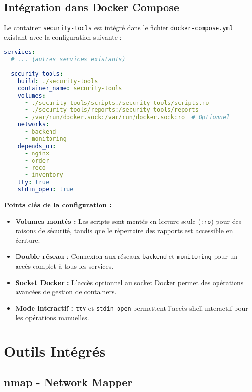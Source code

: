 \subsection{Intégration dans Docker Compose}
Le container \texttt{security-tools} est intégré dans le fichier \texttt{docker-compose.yml} existant avec la configuration suivante :

\begin{lstlisting}[language=YAML, caption=Configuration Docker Compose du Container Security Tools, basicstyle=\ttfamily\tiny]
services:
  # ... (autres services existants)
  
  security-tools:
    build: ./security-tools
    container_name: security-tools
    volumes:
      - ./security-tools/scripts:/security-tools/scripts:ro
      - ./security-tools/reports:/security-tools/reports
      - /var/run/docker.sock:/var/run/docker.sock:ro  # Optionnel
    networks:
      - backend
      - monitoring
    depends_on:
      - nginx
      - order
      - reco
      - inventory
    tty: true
    stdin_open: true
\end{lstlisting}

\textbf{Points clés de la configuration :}
\begin{itemize}
    \item \textbf{Volumes montés :} Les scripts sont montés en lecture seule (\texttt{:ro}) pour des raisons de sécurité, tandis que le répertoire des rapports est accessible en écriture.
    \item \textbf{Double réseau :} Connexion aux réseaux \texttt{backend} et \texttt{monitoring} pour un accès complet à tous les services.
    \item \textbf{Socket Docker :} L'accès optionnel au socket Docker permet des opérations avancées de gestion de containers.
    \item \textbf{Mode interactif :} \texttt{tty} et \texttt{stdin\_open} permettent l'accès shell interactif pour les opérations manuelles.
\end{itemize}

\section{Outils Intégrés}

\subsection{nmap - Network Mapper}

